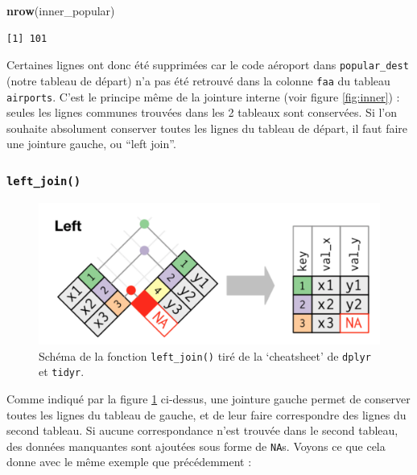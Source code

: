 \documentclass[
  a4paper,
]{article}
\newenvironment{Shaded}{\begin{snugshade}}{\end{snugshade}}
\newcommand{\DataTypeTok}[1]{\textcolor[rgb]{0.00,0.34,0.68}{#1}}
\newcommand{\KeywordTok}[1]{\textcolor[rgb]{0.12,0.11,0.11}{\textbf{#1}}}
\newcommand{\NormalTok}[1]{\textcolor[rgb]{0.12,0.11,0.11}{#1}}
\newcommand{\OperatorTok}[1]{\textcolor[rgb]{0.12,0.11,0.11}{#1}}
\newcommand{\StringTok}[1]{\textcolor[rgb]{0.75,0.01,0.01}{#1}}
\begin{document}
\begin{Shaded}
\begin{Highlighting}[]
\KeywordTok{nrow}\NormalTok{(inner_popular)}
\end{Highlighting}
\end{Shaded}

\begin{verbatim}
[1] 101
\end{verbatim}

Certaines lignes ont donc été supprimées car le code aéroport dans \texttt{popular\_dest} (notre tableau de départ) n'a pas été retrouvé dans la colonne \texttt{faa} du tableau \texttt{airports}. C'est le principe même de la jointure interne (voir figure \ref{fig:inner}) : seules les lignes communes trouvées dans les 2 tableaux sont conservées. Si l'on souhaite absolument conserver toutes les lignes du tableau de départ, il faut faire une jointure gauche, ou ``left join''.

\hypertarget{left_join}{%
\subsubsection{\texorpdfstring{\texttt{left\_join()}}{left\_join()}}\label{left_join}}

\begin{figure}[htpb]

{\centering \includegraphics[width=0.5\linewidth]{images/leftjoin} 

}

\caption{Schéma de la fonction \texttt{left\_join()} tiré de la `cheatsheet' de \texttt{dplyr} et \texttt{tidyr}.}\label{fig:left}
\end{figure}



Comme indiqué par la figure \ref{fig:left} ci-dessus, une jointure gauche permet de conserver toutes les lignes du tableau de gauche, et de leur faire correspondre des lignes du second tableau. Si aucune correspondance n'est trouvée dans le second tableau, des données manquantes sont ajoutées sous forme de \texttt{NA}s. Voyons ce que cela donne avec le même exemple que précédemment :

\begin{Shaded}
\end{Shaded}
\end{document}
